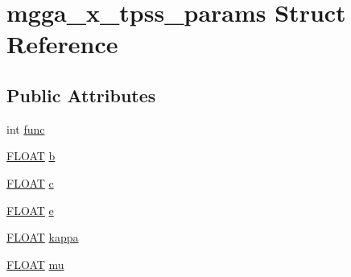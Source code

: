 \hypertarget{structmgga__x__tpss__params}{\section{mgga\-\_\-x\-\_\-tpss\-\_\-params Struct Reference}
\label{structmgga__x__tpss__params}
}
\subsection*{Public Attributes}
\begin{DoxyCompactItemize}
\item 
int \hyperlink{structmgga__x__tpss__params_af8d9ddcc8697f38c4c2d2d4c8a40a05f}{func}
\item 
\hyperlink{src_2xc__config_8h_ae8690abbffa85934d64d545920e2b108}{F\-L\-O\-A\-T} \hyperlink{structmgga__x__tpss__params_a865be4cc5c34883d32cf200ef84bec46}{b}
\item 
\hyperlink{src_2xc__config_8h_ae8690abbffa85934d64d545920e2b108}{F\-L\-O\-A\-T} \hyperlink{structmgga__x__tpss__params_aaec2fa2076dd5c23fba8611f08177b6c}{c}
\item 
\hyperlink{src_2xc__config_8h_ae8690abbffa85934d64d545920e2b108}{F\-L\-O\-A\-T} \hyperlink{structmgga__x__tpss__params_a54b8c49d9e51ba46510d15fd85ad9f0e}{e}
\item 
\hyperlink{src_2xc__config_8h_ae8690abbffa85934d64d545920e2b108}{F\-L\-O\-A\-T} \hyperlink{structmgga__x__tpss__params_af2316eef4c8e1440bb4380ee51326602}{kappa}
\item 
\hyperlink{src_2xc__config_8h_ae8690abbffa85934d64d545920e2b108}{F\-L\-O\-A\-T} \hyperlink{structmgga__x__tpss__params_a54c1e683f0208ff264bf0b386414d4e2}{mu}
\end{DoxyCompactItemize}


